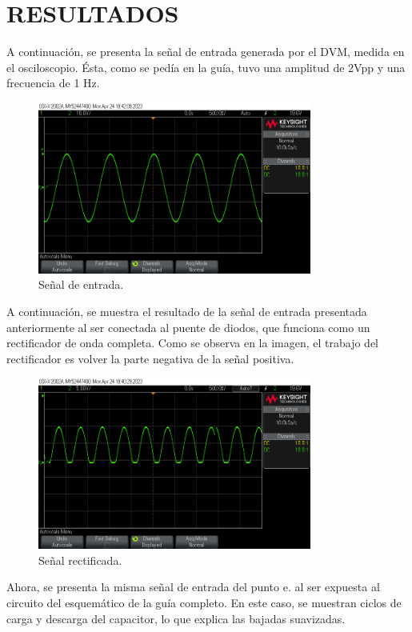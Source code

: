 \documentclass[journal,transmag]{IEEEtran}
\begin{document}
\section{RESULTADOS } 
A continuación, se presenta la señal de entrada generada por el DVM, medida en el osciloscopio. Ésta, como se pedía en la guía, tuvo una amplitud de 2Vpp y una frecuencia de 1 Hz. 
\begin{figure}[!h]
		\center
		\includegraphics[width=9cm]{imgs/s2.png}
		\caption{Señal de entrada. }
		\label{1}
\end{figure}

A continuación, se muestra el resultado de la señal de entrada presentada anteriormente al ser conectada al puente de diodos, que funciona como un rectificador de onda completa. Como se observa en la imagen, el trabajo del rectificador es volver la parte negativa de la señal positiva. 

\begin{figure}[!h]
		\center
		\includegraphics[width=9cm]{imgs/s3.png}
		\caption{Señal rectificada.}
		\label{2}
\end{figure}

Ahora, se presenta la misma señal de entrada del punto e. al ser expuesta al circuito del esquemático de la guía completo. En este caso, se muestran ciclos de carga y descarga del capacitor, lo que explica las bajadas suavizadas. 
\end{document}
